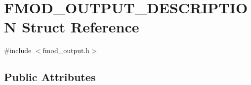\hypertarget{struct_f_m_o_d___o_u_t_p_u_t___d_e_s_c_r_i_p_t_i_o_n}{\section{F\-M\-O\-D\-\_\-\-O\-U\-T\-P\-U\-T\-\_\-\-D\-E\-S\-C\-R\-I\-P\-T\-I\-O\-N Struct Reference}
\label{struct_f_m_o_d___o_u_t_p_u_t___d_e_s_c_r_i_p_t_i_o_n}
}


{\ttfamily \#include $<$fmod\-\_\-output.\-h$>$}

\subsection*{Public Attributes}
